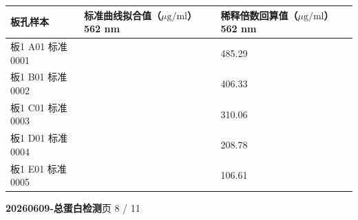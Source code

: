 \documentclass[UTF8,10pt,a4paper,fontset=fandol]{ctexart}
\newcommand{\fieldvalue}[1]{#1}
\begin{document}
\begin{center}
\scriptsize
\begin{tabular}{p{3.2cm}p{3.0cm}p{3.0cm}}
\textbf{板孔样本} &
\textbf{标准曲线拟合值（$\mu\mathrm{g/ml}$）\\562 nm} &
\textbf{稀释倍数回算值（$\mu\mathrm{g/ml}$）\\562 nm}\\ \hline
\fieldvalue{板1 A01 标准0001} &&
\fieldvalue{485.29}\\
\fieldvalue{板1 B01 标准0002} &&
\fieldvalue{406.33}\\
\fieldvalue{板1 C01 标准0003} &&
\fieldvalue{310.06}\\
\fieldvalue{板1 D01 标准0004} &&
\fieldvalue{208.78}\\
\fieldvalue{板1 E01 标准0005} &&
\fieldvalue{106.61}
\end{tabular}
\end{center}

\newpage

\begin{center}
\textbf{20260609-总蛋白检测}\hfill 页 8 / 11
\end{center}
\end{document}
